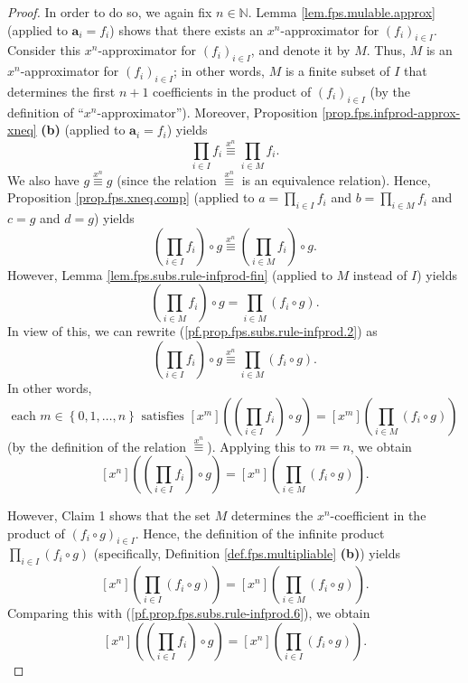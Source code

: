 \begin{fineprint}
\begin{proof}
In order to do so, we again fix $n\in\mathbb{N}$. Lemma
\ref{lem.fps.mulable.approx} (applied to $\mathbf{a}_{i}=f_{i}$) shows that
there exists an $x^{n}$-approximator for $\left(  f_{i}\right)  _{i\in I}$.
Consider this $x^{n}$-approximator for $\left(  f_{i}\right)  _{i\in I}$, and
denote it by $M$. Thus, $M$ is an $x^{n}$-approximator for $\left(
f_{i}\right)  _{i\in I}$; in other words, $M$ is a finite subset of $I$ that
determines the first $n+1$ coefficients in the product of $\left(
f_{i}\right)  _{i\in I}$ (by the definition of \textquotedblleft$x^{n}%
$-approximator\textquotedblright). Moreover, Proposition
\ref{prop.fps.infprod-approx-xneq} \textbf{(b)} (applied to $\mathbf{a}%
_{i}=f_{i}$) yields%
\begin{equation}
\prod_{i\in I}f_{i}\overset{x^{n}}{\equiv}\prod_{i\in M}f_{i}.
\label{pf.prop.fps.subs.rule-infprod.1}%
\end{equation}
We also have $g\overset{x^{n}}{\equiv}g$ (since the relation $\overset{x^{n}%
}{\equiv}$ is an equivalence relation). Hence, Proposition
\ref{prop.fps.xneq.comp} (applied to $a=\prod_{i\in I}f_{i}$ and
$b=\prod_{i\in M}f_{i}$ and $c=g$ and $d=g$) yields%
\begin{equation}
\left(  \prod_{i\in I}f_{i}\right)  \circ g\overset{x^{n}}{\equiv}\left(
\prod_{i\in M}f_{i}\right)  \circ g. \label{pf.prop.fps.subs.rule-infprod.2}%
\end{equation}
However, Lemma \ref{lem.fps.subs.rule-infprod-fin} (applied to $M$ instead of
$I$) yields%
\[
\left(  \prod_{i\in M}f_{i}\right)  \circ g=\prod_{i\in M}\left(  f_{i}\circ
g\right)  .
\]
In view of this, we can rewrite (\ref{pf.prop.fps.subs.rule-infprod.2}) as
\[
\left(  \prod_{i\in I}f_{i}\right)  \circ g\overset{x^{n}}{\equiv}\prod_{i\in
M}\left(  f_{i}\circ g\right)  .
\]
In other words,
\[
\text{each }m\in\left\{  0,1,\ldots,n\right\}  \text{ satisfies }\left[
x^{m}\right]  \left(  \left(  \prod_{i\in I}f_{i}\right)  \circ g\right)
=\left[  x^{m}\right]  \left(  \prod_{i\in M}\left(  f_{i}\circ g\right)
\right)
\]
(by the definition of the relation $\overset{x^{n}}{\equiv}$). Applying this
to $m=n$, we obtain%
\begin{equation}
\left[  x^{n}\right]  \left(  \left(  \prod_{i\in I}f_{i}\right)  \circ
g\right)  =\left[  x^{n}\right]  \left(  \prod_{i\in M}\left(  f_{i}\circ
g\right)  \right)  . \label{pf.prop.fps.subs.rule-infprod.6}%
\end{equation}


However, Claim 1 shows that the set $M$ determines the $x^{n}$-coefficient in
the product of $\left(  f_{i}\circ g\right)  _{i\in I}$. Hence, the definition
of the infinite product $\prod_{i\in I}\left(  f_{i}\circ g\right)  $
(specifically, Definition \ref{def.fps.multipliable} \textbf{(b)}) yields%
\[
\left[  x^{n}\right]  \left(  \prod_{i\in I}\left(  f_{i}\circ g\right)
\right)  =\left[  x^{n}\right]  \left(  \prod_{i\in M}\left(  f_{i}\circ
g\right)  \right)  .
\]
Comparing this with (\ref{pf.prop.fps.subs.rule-infprod.6}), we obtain%
\[
\left[  x^{n}\right]  \left(  \left(  \prod_{i\in I}f_{i}\right)  \circ
g\right)  =\left[  x^{n}\right]  \left(  \prod_{i\in I}\left(  f_{i}\circ
g\right)  \right)  .
\]



\end{proof}
\end{fineprint}
